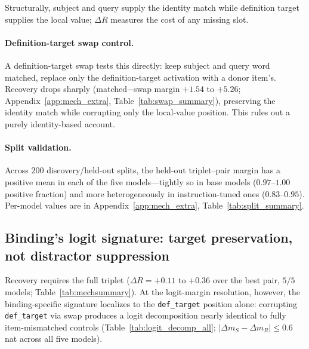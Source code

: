 \documentclass[11pt]{article}
\begin{document}
Structurally, subject and query supply the identity match while definition target supplies
the local value; $\Delta R$ measures the cost of any missing slot.

\paragraph{Definition-target swap control.}
A definition-target swap tests this directly: keep subject and query word matched, replace
only the definition-target activation with a donor item's. Recovery drops sharply
(matched$-$swap margin $+1.54$ to $+5.26$; Appendix~\ref{app:mech_extra},
Table~\ref{tab:swap_summary}), preserving the identity match while corrupting only the
local-value position. This rules out a purely identity-based account.

\paragraph{Split validation.}
Across $200$ discovery/held-out splits, the held-out triplet--pair margin has a positive mean
in each of the five models---tightly so in base models ($0.97$--$1.00$ positive fraction) and
more heterogeneously in instruction-tuned ones ($0.83$--$0.95$). Per-model values are in
Appendix~\ref{app:mech_extra}, Table~\ref{tab:split_summary}.

\subsection{Binding's logit signature: target preservation, not distractor suppression}

Recovery requires the full triplet ($\Delta R = +0.11$ to $+0.36$ over the best pair, $5/5$
models; Table~\ref{tab:mechsummary}). At the logit-margin resolution, however, the
binding-specific signature localizes to the \texttt{def\_target} position alone: corrupting
\texttt{def\_target} via swap produces a logit decomposition nearly identical to fully
item-mismatched controls (Table~\ref{tab:logit_decomp_all}; $|\Delta m_S - \Delta m_R| \leq 0.6$
nat across all five models).
\end{document}
